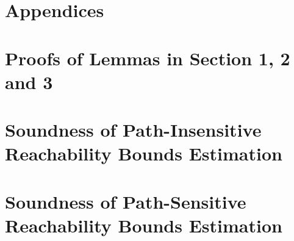 \documentclass[a4paper,11pt]{article}
\begin{document}
%
% 
%
\clearpage
\appendix
{}
\section*{Appendices}
\section{Proofs of Lemmas in Section 1, 2 and 3}
\label{apdx:lemma_sec123}

\clearpage
% 
\clearpage
\section{Soundness of Path-Insensitive Reachability Bounds Estimation}
\label{apdx:pathinsensitive_rb_soundness}

\clearpage
\section{Soundness of Path-Sensitive Reachability Bounds Estimation}
\label{apdx:pathsensitive_rb_soundness}


\clearpage


\end{document}
